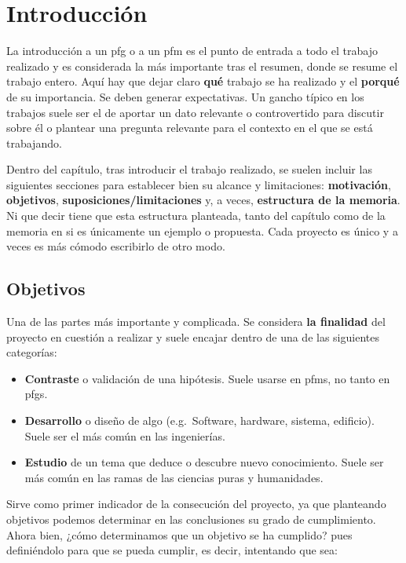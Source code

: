 \chapter{Introducción}
\label{ch:introduccion}

La introducción a un \gls{pfg} o a un \gls{pfm} es el punto de entrada a todo el trabajo realizado y es considerada la más importante tras el resumen, donde se resume el trabajo entero. Aquí hay que dejar claro \textbf{qué} trabajo se ha realizado y el \textbf{porqué} de su importancia. Se deben generar expectativas. Un gancho típico en los trabajos suele ser el de aportar un dato relevante o controvertido para discutir sobre él o plantear una pregunta relevante para el contexto en el que se está trabajando.

Dentro del capítulo, tras introducir el trabajo realizado, se suelen incluir las siguientes secciones para establecer bien su alcance y limitaciones: \textbf{motivación}, \textbf{objetivos}, \textbf{suposiciones/limitaciones} y, a veces, \textbf{estructura de la memoria}. Ni que decir tiene que esta estructura planteada, tanto del capítulo como de la memoria en si es únicamente un ejemplo o propuesta. Cada proyecto es único y a veces es más cómodo escribirlo de otro modo.

\section{Objetivos}

Una de las partes más importante y complicada. Se considera \textbf{la finalidad} del proyecto en cuestión a realizar y suele encajar dentro de una de las siguientes categorías:

\begin{itemize}
    \item \textbf{Contraste} o validación de una hipótesis. Suele usarse en \glspl{pfm}, no tanto en \glspl{pfg}.
    \item \textbf{Desarrollo} o diseño de algo (e.g.~Software, hardware, sistema, edificio). Suele ser el más común en las ingenierías.
    \item \textbf{Estudio} de un tema que deduce o descubre nuevo conocimiento. Suele ser más común en las ramas de las ciencias puras y humanidades.
\end{itemize}

Sirve como primer indicador de la consecución del proyecto, ya que planteando objetivos podemos determinar en las conclusiones su grado de cumplimiento. Ahora bien, ¿cómo determinamos que un objetivo se ha cumplido? pues definiéndolo para que se pueda cumplir, es decir, intentando que sea:

